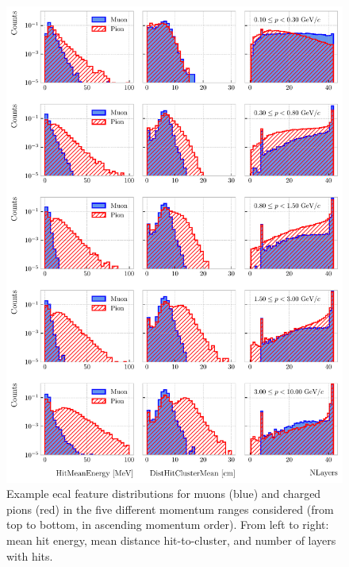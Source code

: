 \begin{figure}[p!]
	\centering
	\includegraphics[width=.95\linewidth]{Images/GArSoft_PID/BDT/ecal_feature_distribution_all_example.pdf}
	\caption[Example \gls{ecal} feature distributions for muons and charged pions in the five different momentum ranges considered.]{Example \gls{ecal} feature distributions for muons (blue) and charged pions (red) in the five different momentum ranges considered (from top to bottom, in ascending momentum order). From left to right: mean hit energy, mean distance hit-to-cluster, and number of layers with hits.}
	\label{fig:ecal_feature_example}
\end{figure}

